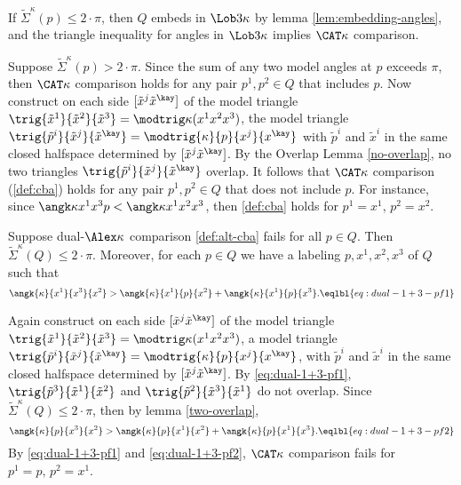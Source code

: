 If $\tilde \Sigma^{\kappa}(p)\le 2\cdot \pi$, then $Q$ embeds in $\Lob3\kappa$ by lemma \ref{lem:embedding-angles}, and the triangle inequality for angles in $\Lob3\kappa$ implies $\CAT\kappa$ comparison.

Suppose $\tilde \Sigma^{\kappa}(p)> 2\cdot \pi$.  
Since the sum of any two model angles at $p$ exceeds $\pi$, then $\CAT\kappa$  comparison holds for any pair $p^1,p^2\in Q$ that includes $p$. 
Now construct on each side $[\tilde x^j\tilde x^\kay]$ of the model triangle $\trig{\tilde x^1}{ \tilde x^2}{ \tilde x^3} = \modtrig\kappa(x^1 x^2 x^3 )$, the model triangle $\trig{\tilde p^i}{\tilde x^j}{\tilde x^\kay}=\modtrig{\kappa}{p}{x^j}{x^\kay}$ with $\tilde p^i$ and $\tilde x^i$  in the same closed halfspace determined by $[\tilde x^j\tilde x^\kay]$.  
By the Overlap Lemma \ref{no-overlap}, no two triangles $\trig{\tilde p^i}{\tilde x^j}{\tilde x^\kay}$ overlap. 
It follows that $\CAT\kappa$ comparison  (\ref{def:cba}) holds for any pair $p^1,p^2\in Q$ that does not include $p$.  
For instance, since $\angk\kappa {x^1}{x^3}p<\angk\kappa {x^1}{x^2}{x^3}$, then  \ref{def:cba} holds for $p^1=x^1$, $p^2=x^2$.

Suppose dual-$\Alex\kappa$ comparison \ref{def:alt-cba}  fails for all $p\in Q$. 
Then  $\tilde \Sigma^{\kappa}(Q)\le 2\cdot \pi$. 
Moreover, for each $p\in Q$ we have a labeling $p, x^1,x^2,x^3$ of $Q$ such that 
\[\angk{\kappa} {x^1}{x^3}{x^2}
>
\angk{\kappa} {x^1}{p}{x^2}+\angk{\kappa} {x^1}{p}{x^3}.
\eqlbl{eq:dual-1+3-pf1}\]

Again construct on each side  $[\tilde x^j\tilde x^\kay]$ of the model triangle $\trig{\tilde x^1}{ \tilde x^2}{ \tilde x^3} = \modtrig\kappa(x^1 x^2 x^3 )$, a model triangle $\trig{\tilde p^i}{\tilde x^j}{\tilde x^\kay}=\modtrig{\kappa}{p}{x^j}{x^\kay}$, with $\tilde p^i$ and $\tilde x^i$  in the same closed halfspace determined by $[\tilde x^j\tilde x^\kay]$.  
 By \ref{eq:dual-1+3-pf1}, $\trig{\tilde p^3}{\tilde x^1}{\tilde x^2}$ and $\trig{\tilde p^2}{\tilde x^3}{\tilde x^1}$ do not overlap.
Since $\tilde \Sigma^{\kappa}(Q)\le 2\cdot \pi$, then by lemma \ref{two-overlap},
\[\angk{\kappa} {p}{x^3}{x^2}>\angk{\kappa} {p}{x^1}{x^2}+\angk{\kappa} {p}{x^1}{x^3}.\eqlbl{eq:dual-1+3-pf2}\]
By \ref{eq:dual-1+3-pf1} and \ref{eq:dual-1+3-pf2},  $\CAT\kappa$  comparison fails  for $p^1=p, \,p^2=x^1$.  
 \qeds
